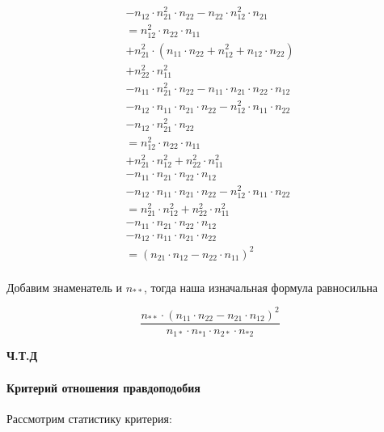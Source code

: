 \documentclass{article}
\begin{document}
\begin{multline*}
       - n_{12} \cdot n_{21}^{2} \cdot n_{22} - n_{22} \cdot n_{12}^{2} \cdot n_{21} \\
       = n_{12}^{2} \cdot n_{22} \cdot n_{11} \\
       + n_{21}^{2} \cdot (n_{11} \cdot n_{22} + n_{12}^{2} + n_{12} \cdot n_{22}) \\
       + n_{22}^{2} \cdot n_{11}^{2} \\
       - n_{11} \cdot n_{21}^{2} \cdot n_{22} - n_{11} \cdot n_{21} \cdot n_{22} \cdot n_{12} \\
       - n_{12} \cdot n_{11} \cdot n_{21} \cdot n_{22} - n_{12}^{2} \cdot n_{11} \cdot n_{22} \\
       - n_{12} \cdot n_{21}^{2} \cdot n_{22}  \\
       = n_{12}^{2} \cdot n_{22} \cdot n_{11} \\
       + n_{21}^{2} \cdot n_{12}^{2} + n_{22}^{2} \cdot n_{11}^{2} \\
       - n_{11} \cdot n_{21} \cdot n_{22} \cdot n_{12} \\
       - n_{12} \cdot n_{11} \cdot n_{21} \cdot n_{22} - n_{12}^{2} \cdot n_{11} \cdot n_{22} \\
       = n_{21}^{2} \cdot n_{12}^{2} + n_{22}^{2} \cdot n_{11}^{2} \\
       - n_{11} \cdot n_{21} \cdot n_{22} \cdot n_{12} \\
       - n_{12} \cdot n_{11} \cdot n_{21} \cdot n_{22} \\
       = (n_{21} \cdot n_{12} - n_{22} \cdot n_{11})^{2} \\
    \end{multline*}
    
    
    Добавим знаменатель и $n_{**}$, тогда наша изначальная формула равносильна 
    
    \begin{equation}
        \frac{n_{**} \cdot (n_{11}
        \cdot n_{22} - n_{21} \cdot n_{12})^{2}}{n_{1*} \cdot n_{*1} \cdot n_{2*} \cdot n_{*2}}
    \end{equation}
    
    \textbf{Ч.Т.Д}
    

    \paragraph{Критерий отношения правдоподобия}

    \quad


    Рассмотрим статистику критерия:
\end{document}
